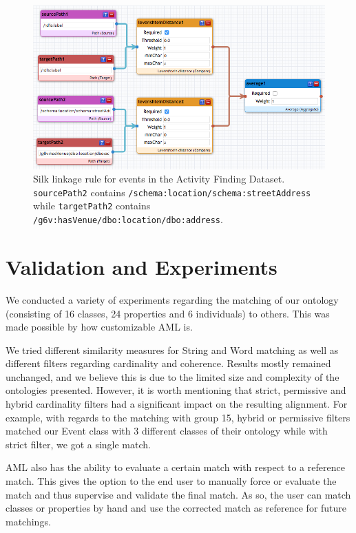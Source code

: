 \documentclass[runningheads,a4paper]{../../StyleFiles/llncs}
\begin{document}
\begin{figure}[h]
	\centering
	\includegraphics[width=1\textwidth]{img/link_event_g15.png}
	\caption{Silk linkage rule for events in the Activity Finding Dataset.
		\texttt{sourcePath2} contains
		\texttt{/schema:location/schema:streetAddress} while
		\texttt{targetPath2} contains
		\texttt{/g6v:hasVenue/dbo:location/dbo:address}.}
	\label{fig:link_event_g15}
\end{figure}


\section{Validation and Experiments}
We conducted a variety of experiments regarding the matching of our ontology (consisting of 16 classes, 24 properties and 6 individuals) to others. This was made possible by how customizable AML is.

We tried different similarity measures for String and Word matching as well as different filters regarding cardinality and coherence. Results mostly remained unchanged, and we believe this is due to the limited size and complexity of the ontologies presented. However, it is worth mentioning that strict, permissive and hybrid cardinality filters had a significant impact on the resulting alignment. For example, with regards to the matching with group 15, hybrid or permissive filters matched our Event class with 3 different classes of their ontology while with strict filter, we got a single match. 

AML also has the ability to evaluate a certain match with respect to a reference match. This gives the option to the end user to manually force or evaluate the match and thus supervise and validate the final match. As so, the user can match classes or properties by hand and use the corrected match as reference for future matchings.
\end{document}
